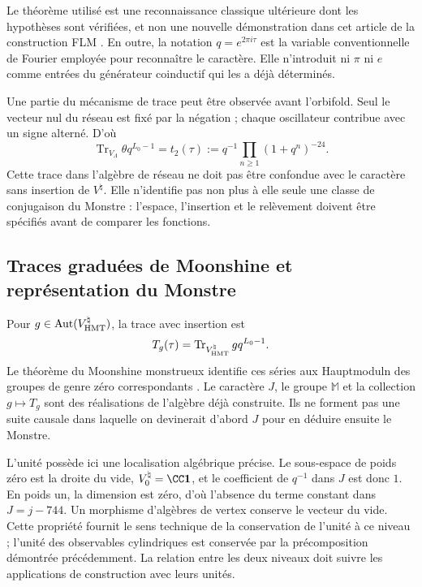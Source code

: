 Le théorème utilisé est une reconnaissance classique ultérieure dont les hypothèses sont vérifiées, et non une nouvelle démonstration dans cet article de la construction FLM \cite{flm}. En outre, la notation $q=e^{2\pi i\tau}$ est la variable conventionnelle de Fourier employée pour reconnaître le caractère. Elle n'introduit ni $\pi$ ni $e$ comme entrées du générateur coinductif qui les a déjà déterminés.

Une partie du mécanisme de trace peut être observée avant l'orbifold.
Seul le vecteur nul du réseau est fixé par la négation ; chaque
oscillateur contribue avec un signe alterné. D'où
\[
 \operatorname{Tr}_{V_\Lambda}\theta q^{L_0-1}
   =t_2(\tau)
   :=q^{-1}\prod_{n\geq1}(1+q^n)^{-24}.
\]
Cette trace dans l'algèbre de réseau ne doit pas être confondue avec le
caractère sans insertion de $V^\natural$. Elle n'identifie pas non plus à elle
seule une classe de conjugaison du Monstre : l'espace, l'insertion
et le relèvement doivent être spécifiés avant de comparer les fonctions.







\subsection{Traces graduées de Moonshine et représentation du Monstre}
\label{exc:alcance}

Pour $g\in\operatorname{Aut}(V^\natural_{\rm HMT})$, la trace avec insertion est
\[
 T_g(\tau)=
 \operatorname{Tr}_{V^\natural_{\rm HMT}}gq^{L_0-1}.
\]
Le théorème du Moonshine monstrueux identifie ces séries aux
Hauptmoduln des groupes de genre zéro correspondants
\cite[théorème~1.1]{borcherds}.
Le caractère $J$, le groupe $\mathbb M$ et la collection $g\mapsto T_g$
sont des réalisations de l'algèbre déjà construite. Ils ne forment pas une suite
causale dans laquelle on devinerait d'abord $J$ pour en déduire ensuite le Monstre.

L'unité possède ici une localisation algébrique précise. Le sous-espace de poids zéro est la droite du vide, \(V^\natural_0=\CC\mathbf1\), et le coefficient de \(q^{-1}\) dans \(J\) est donc \(1\). En poids un, la dimension est zéro, d'où l'absence du terme constant dans \(J=j-744\). Un morphisme d'algèbres de vertex conserve le vecteur du vide. Cette propriété fournit le sens technique de la conservation de l'unité à ce niveau ; l'unité des observables cylindriques est conservée par la précomposition démontrée précédemment. La relation entre les deux niveaux doit suivre les applications de construction avec leurs unités.

